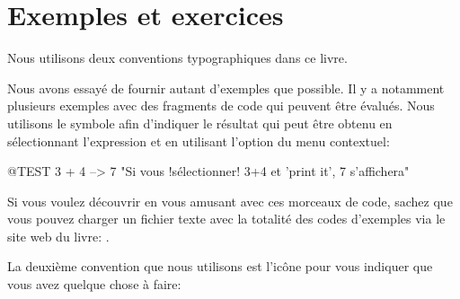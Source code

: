 \documentclass[a4paper,10pt,twoside]{book}
\begin{document}
\section*{Exemples et exercices}

Nous utilisons deux conventions typographiques dans ce livre.

Nous avons essayé de fournir autant d'exemples que possible.
Il y a notamment plusieurs exemples avec des fragments de code qui
peuvent être évalués. Nous utilisons le symbole \ct{-->} afin
d'indiquer le résultat qui peut être obtenu en sélectionnant
l'expression et en utilisant l'option  du menu contextuel:

\begin{code}{@TEST}
3 + 4 --> 7    "Si vous !sélectionner! 3+4 et 'print it', 7 s'affichera"
\end{code}

Si vous voulez découvrir \pharo en vous amusant avec ces morceaux de
code, sachez que vous pouvez charger un fichier texte avec la
totalité des codes d'exemples via le site web du livre: \ppe. 

La deuxième convention que nous utilisons est l'icône
\dothisicon{} pour vous indiquer que vous avez quelque chose à faire: 






\end{document}

